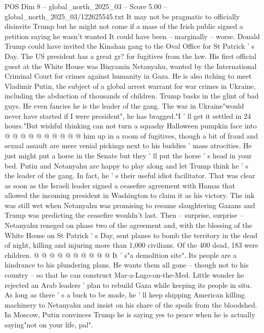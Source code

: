 \begin{textsample}{POS Dim 8 – global\_north\_2025\_03 – Score 5.00 – global\_north\_2025\_03/122625545.txt}  \label{ex:f8_pos_336}
It may not be pragmatic to officially disinvite Trump but he might not come if a mass of the Irish public signed a petition saying he wasn't wanted It could have been -- marginally -- worse.
Donald Trump could have invited the Kinahan gang to the Oval Office for St Patrick ' s Day.
The US president has a great gr? for fugitives from the law.
His first official guest at the White House was Binyamin Netanyahu, wanted by the International Criminal Court for crimes against humanity in Gaza.
He is also itching to meet Vladimir Putin, the subject of a global arrest warrant for war crimes in Ukraine, including the abduction of thousands of children.
Trump basks in the glint of bad guys.
He even fancies he is the leader of the gang.
The war in Ukraine"would never have started if I were president", he has bragged."I ' ll get it settled in 24 hours."But wishful thinking can not turn a squashy Halloween pumpkin face into @ @ @ @ @ @ @ @ @ @ him up in a room of fugitives, though a bit of fraud and sexual assault are mere venial pickings next to his buddies ' mass atrocities.
He just might put a horse in the Senate but they ' ll put the horse ' s head in your bed.
Putin and Netanyahu are happy to play along and let Trump think he ' s the leader of the gang.
In fact, he ' s their useful idiot facilitator.
That was clear as soon as the Israeli leader signed a ceasefire agreement with Hamas that allowed the incoming president in Washington to claim it as his victory.
The ink was still wet when Netanyahu was promising to resume slaughtering Gazans and Trump was predicting the ceasefire wouldn't last.
Then -- surprise, surprise -- Netanyahu reneged on phase two of the agreement and, with the blessing of the White House on St Patrick ' s Day, sent planes to bomb the territory in the dead of night, killing and injuring more than 1,000 civilians.
Of the 400 dead, 183 were children. @ @ @ @ @ @ @ @ @ @ It ' s"a demolition site".
Its people are a hindrance to his plundering plans.
He wants them all gone -- though not to his country -- so that he can construct Mar-a-Lago-on-the-Med.
Little wonder he rejected an Arab leaders ' plan to rebuild Gaza while keeping its people in situ.
As long as there ' s a buck to be made, he ' ll keep shipping American killing machinery to Netanyahu and insist on his share of the spoils from the bloodshed.
In Moscow, Putin convinces Trump he is saying yes to peace when he is actually saying"not on your life, pal".

\end{textsample}
